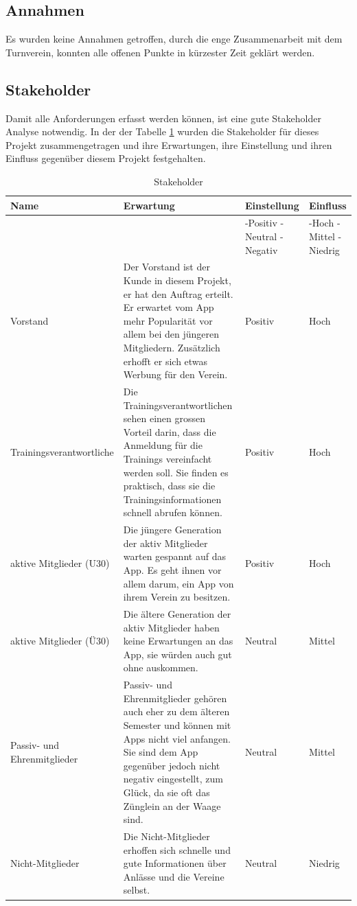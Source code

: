 \FloatBarrier
\subsection{Annahmen}\label{annahmen}
Es wurden keine Annahmen getroffen, durch die enge Zusammenarbeit mit dem Turnverein, konnten alle offenen Punkte in kürzester Zeit geklärt werden.

\newpage
\subsection{Stakeholder}\label{stakeholder}
Damit alle Anforderungen erfasst werden können, ist eine gute Stakeholder Analyse notwendig. In der der Tabelle \ref{table:stakeholder} wurden die Stakeholder für dieses Projekt zusammengetragen und ihre Erwartungen, ihre Einstellung und ihren Einfluss gegenüber diesem Projekt festgehalten.

\begin{table}[ht]
\centering
  \begin{tabular}{ l | p{5cm} | p{1.5cm} | p{1.5cm} }
	\hline
	\rowcolor{darkgray}
	Name							&	Erwartung		&	Einstellung 	&	Einfluss	\\ \hline
	\rowcolor{gray}
								&				&	-Positiv \mbox{-Neutral} \mbox{-Negativ} 	&	-Hoch \mbox{-Mittel} \mbox{-Niedrig} \\ \hline
	Vorstand						&	Der Vorstand ist der Kunde in diesem Projekt, er hat den Auftrag erteilt. Er erwartet vom App mehr Popularität vor allem bei den jüngeren Mitgliedern. Zusätzlich erhofft er sich etwas Werbung für den Verein.			
												& 	Positiv		&	Hoch		\\ \hline
	Trainingsverantwortliche				&	Die Trainingsverantwortlichen sehen einen grossen Vorteil darin, dass die Anmeldung für die Trainings vereinfacht werden soll. Sie finden es praktisch, dass sie die Trainingsinformationen schnell abrufen können.			
												& 	Positiv		&	Hoch		\\ \hline
	aktive Mitglieder (U30)				&	Die jüngere Generation der aktiv Mitglieder warten gespannt auf das App. Es geht ihnen vor allem darum, ein App von ihrem Verein zu besitzen.			
												& 	Positiv		&	Hoch		\\ \hline
	aktive Mitglieder (Ü30)				&	Die ältere Generation der aktiv Mitglieder haben keine Erwartungen an das App, sie würden auch gut ohne auskommen. 		
												& 	Neutral	&	Mittel		\\ \hline
	Passiv- und Ehrenmitglieder			&	Passiv- und Ehrenmitglieder gehören auch eher zu dem älteren Semester und können mit Apps nicht viel anfangen. Sie sind dem App gegenüber jedoch nicht negativ eingestellt, zum Glück, da sie oft das Zünglein an der Waage sind.
												& 	Neutral	&	Mittel		\\ \hline
	Nicht-Mitglieder					&	Die Nicht-Mitglieder erhoffen sich schnelle und gute Informationen über Anlässe und die Vereine selbst.
												& 	Neutral	&	Niedrig	\\ \hline
  \end{tabular}
   \caption{Stakeholder}\label{table:stakeholder}
\end{table}

